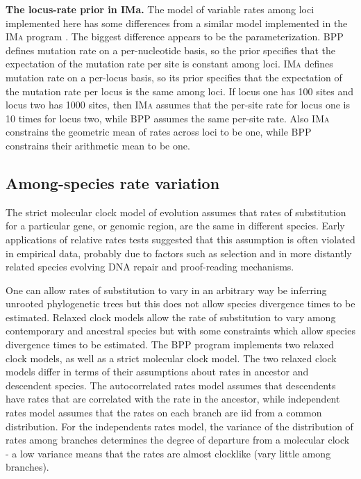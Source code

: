\documentclass[a4paper]{book}
\numberwithin{equation}{section} \renewcommand{\baselinestretch}{0.55}
\begin{document}
\begin{mdframed}
  \textbf{The locus-rate prior in IMa.}  The model of variable rates
  among loci implemented here has some differences from a similar
  model implemented in the \textsc{IMa} program \citep{Hey2004}.  The
  biggest difference appears to be the parameterization.  \textsc{BPP}
  defines mutation rate on a per-nucleotide basis, so the prior
  specifies that the expectation of the mutation rate per site is
  constant among loci.  \textsc{IMa} defines mutation rate on a
  per-locus basis, so its prior specifies that the expectation of the
  mutation rate per locus is the same among loci.  If locus one has
  100 sites and locus two has 1000 sites, then \textsc{IMa} assumes
  that the per-site rate for locus one is 10 times for locus two,
  while \textsc{BPP} assumes the same per-site rate.  Also
  \textsc{IMa} constrains the geometric mean of rates across loci to
  be one, while \textsc{BPP} constrains their arithmetic mean to be
  one.
\end{mdframed}

\subsection{Among-species rate variation}
The strict molecular clock model of evolution assumes that rates of
substitution for a particular gene, or genomic region, are the same in
different species. Early applications of relative rates tests
suggested that this assumption is often violated in empirical data,
probably due to factors such as selection and in more distantly
related species evolving DNA repair and proof-reading mechanisms.

One can allow rates of substitution to vary in an arbitrary way be
inferring unrooted phylogenetic trees but this does not allow species
divergence times to be estimated. Relaxed clock models allow the rate
of substitution to vary among contemporary and ancestral species but
with some constraints which allow species divergence times to be
estimated. The BPP program implements two relaxed clock models, as
well as a strict molecular clock model. The two relaxed clock models
differ in terms of their assumptions about rates in ancestor and
descendent species. The autocorrelated rates model assumes that
descendents have rates that are correlated with the rate in the
ancestor, while independent rates model assumes that the rates on each
branch are iid from a common distribution.  For the independents rates
model, the variance of the distribution of rates among branches
determines the degree of departure from a molecular clock - a low
variance means that the rates are almost clocklike (vary little among
branches).
\end{document}
